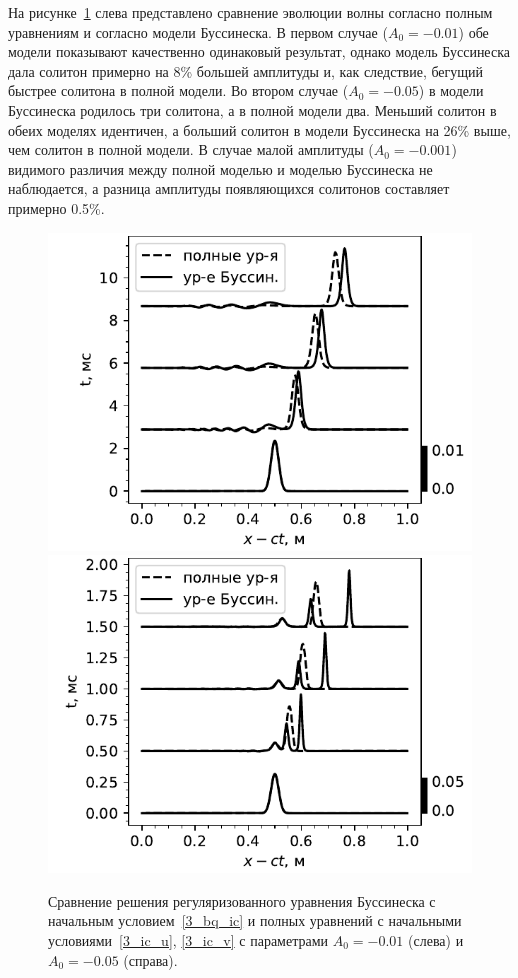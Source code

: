\documentclass[12pt, a4paper]{report}
\begin{document}
На рисунке~\ref{fig:evol_compare} слева представлено сравнение эволюции волны согласно полным уравнениям и согласно модели Буссинеска.
В первом случае ($A_0=-0.01$) обе модели показывают качественно одинаковый результат, однако модель Буссинеска дала солитон примерно на 8\% большей амплитуды и, как следствие, бегущий быстрее солитона в полной модели. Во втором случае ($A_0=-0.05$) в модели Буссинеска родилось три солитона, а в полной модели два. Меньший солитон в обеих моделях идентичен, а больший солитон в модели Буссинеска на 26\% выше, чем солитон в полной модели. В случае малой амплитуды ($A_0=-0.001$) видимого различия между полной моделью и моделью Буссинеска не наблюдается, а разница амплитуды появляющихся солитонов составляет примерно 0.5\%.
\begin{figure}[h]
	\centering
	\includegraphics[width=0.49\linewidth]{Figures/SolEvolCompareSmallBlack}
	\includegraphics[width=0.49\linewidth]{Figures/SolEvolCompareSmallBlack2}
	\caption{Сравнение решения регуляризованного уравнения Буссинеска с начальным  условием~\eqref{3_bq_ic} и полных уравнений с начальными  условиями~\eqref{3_ic_u}, \eqref{3_ic_v} с параметрами $A_0=-0.01$ (слева) и $A_0=-0.05$ (справа).}
	\label{fig:evol_compare}
\end{figure}
\end{document}
